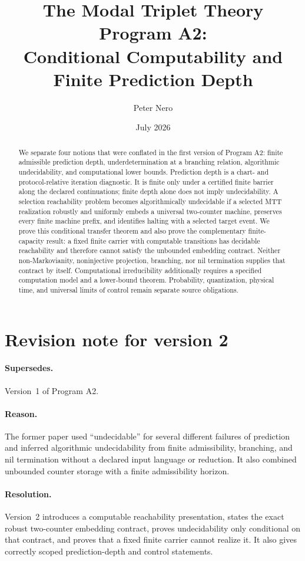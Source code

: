 \documentclass[11pt]{article}
\title{The Modal Triplet Theory Program A2:\\
Conditional Computability and Finite Prediction Depth}
\author{Peter Nero}
\date{July 2026}
\begin{document}
\maketitle

\begin{abstract}
We separate four notions that were conflated in the first version of Program
A2: finite admissible prediction depth, underdetermination at a branching
relation, algorithmic undecidability, and computational lower bounds.
Prediction depth is a chart- and protocol-relative iteration diagnostic.  It
is finite only under a certified finite barrier along the declared
continuations; finite depth alone does not imply undecidability.  A selection
reachability problem becomes algorithmically undecidable if a selected MTT
realization robustly and uniformly embeds a universal two-counter machine,
preserves every finite machine prefix, and identifies halting with a selected
target event.  We prove this conditional transfer theorem and also prove the
complementary finite-capacity result: a fixed finite carrier with computable
transitions has decidable reachability and therefore cannot satisfy the
unbounded embedding contract.  Neither non-Markovianity, noninjective
projection, branching, nor nil termination supplies that contract by itself.
Computational irreducibility additionally requires a specified computation
model and a lower-bound theorem.  Probability, quantization, physical time,
and universal limits of control remain separate source obligations.
\end{abstract}

\section*{Revision note for version 2}
\paragraph{Supersedes.}
Version~1 of Program A2.
\paragraph{Reason.}
The former paper used ``undecidable'' for several different failures of
prediction and inferred algorithmic undecidability from finite admissibility,
branching, and nil termination without a declared input language or reduction.
It also combined unbounded counter storage with a finite admissibility horizon.
\paragraph{Resolution.}
Version~2 introduces a computable reachability presentation, states the exact
robust two-counter embedding contract, proves undecidability only conditional
on that contract, and proves that a fixed finite carrier cannot realize it.
It also gives correctly scoped prediction-depth and control statements.
\end{document}
